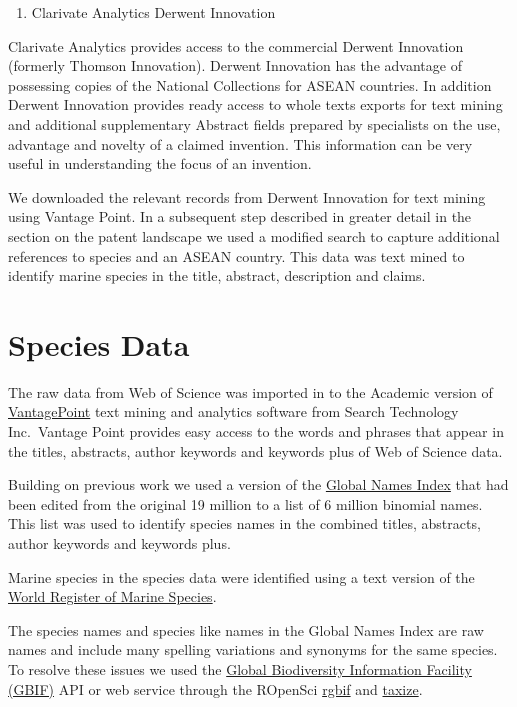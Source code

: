 \documentclass[openany]{book}
\providecommand{\tightlist}{%
  \setlength{\itemsep}{0pt}\setlength{\parskip}{0pt}}
\theoremstyle{definition}
\theoremstyle{definition}
\theoremstyle{definition}
\theoremstyle{remark}
\begin{document}
\begin{enumerate}
\def\labelenumi{\arabic{enumi}.}
\setcounter{enumi}{2}
\tightlist
\item
  Clarivate Analytics Derwent Innovation
\end{enumerate}

Clarivate Analytics provides access to the commercial Derwent Innovation
(formerly Thomson Innovation). Derwent Innovation has the advantage of
possessing copies of the National Collections for ASEAN countries. In
addition Derwent Innovation provides ready access to whole texts exports
for text mining and additional supplementary Abstract fields prepared by
specialists on the use, advantage and novelty of a claimed invention.
This information can be very useful in understanding the focus of an
invention.

We downloaded the relevant records from Derwent Innovation for text
mining using Vantage Point. In a subsequent step described in greater
detail in the section on the patent landscape we used a modified search
to capture additional references to species and an ASEAN country. This
data was text mined to identify marine species in the title, abstract,
description and claims.

\hypertarget{species-data}{%
\section{Species Data}\label{species-data}}

The raw data from Web of Science was imported in to the Academic version
of \href{https://thevantagepoint.com/}{VantagePoint} text mining and
analytics software from Search Technology Inc.~Vantage Point provides
easy access to the words and phrases that appear in the titles,
abstracts, author keywords and keywords plus of Web of Science data.

Building on previous work we used a version of the
\href{http://gni.globalnames.org/}{Global Names Index} that had been
edited from the original 19 million to a list of 6 million binomial
names. This list was used to identify species names in the combined
titles, abstracts, author keywords and keywords plus.

Marine species in the species data were identified using a text version
of the \href{http://www.marinespecies.org/}{World Register of Marine
Species}.

The species names and species like names in the Global Names Index are
raw names and include many spelling variations and synonyms for the same
species. To resolve these issues we used the
\href{https://www.gbif.org/}{Global Biodiversity Information Facility
(GBIF)} API or web service through the ROpenSci \href{}{rgbif} and
\href{}{taxize}.
\end{document}
